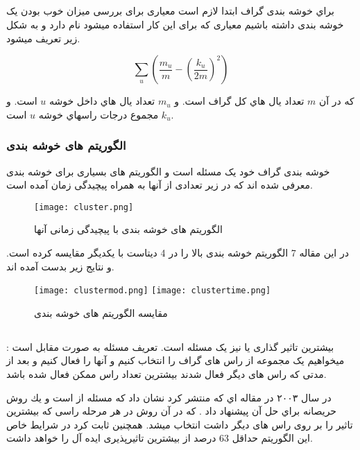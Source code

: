 \documentclass[12pt]{article}
\begin{document}
\subsection{}
\subsubsection{}
براي خوشه بندی گراف ابتدا لازم است معياری برای بررسی ميزان خوب بودن يک خوشه بندی داشته 
باشيم معياری که برای اين کار استفاده ميشود 
 نام دارد و به شكل زير تعريف ميشود.
 
\[
\sum_u \left(\frac{m_u}{m} - \left( \frac{k_u}{2m} \right) ^ 2 \right)
\]

كه در آن 
$m$
 تعداد يال هاي كل گراف است. و 
 $m_u$
  تعداد يال هاي داخل خوشه 
  $u$
   است. و 
   $k_u$
    مجموع 
درجات راسهاي خوشه 
$u$
 است.
 
\subsubsection{الگوریتم های خوشه بندی}
خوشه بندی گراف خود یک مسئله 
است و الگوریتم های بسیاری برای خوشه بندی معرفی شده اند که در زير تعدادی از آنها به همراه 
پيچيدگی زمان آمده است.

\begin{figure}[htbp]
\centering
\texttt{[image: cluster.png]}
\caption{الگوریتم های خوشه بندی با پیچیدگی زمانی آنها}
\end{figure}

\newpage

در این مقاله 7 الگوریتم خوشه بندی بالا را در 4 دیتاست با یکدیگر مقایسه کرده است.
\cite{lee}
و نتایج زیر بدست آمده اند.

\begin{figure}[htbp]
\texttt{[image: clustermod.png]}
\texttt{[image: clustertime.png]}
\caption{مقایسه الگوریتم های خوشه بندی}
\end{figure}


\subsection{}
بیشترین تاثیر گذاری یا 
نیز یک مسئله 
است.
تعریف مسئله به صورت مقابل است : میخواهیم یک مجموعه از راس های گراف را انتخاب کنیم و آنها را فعال کنیم و بعد از مدتی که راس های دیگر فعال شدند بیشترین تعداد راس ممکن فعال شده باشد.

در سال ۲۰۰۳ در مقاله اي كه 
 منتشر كرد
 نشان داد كه مسئله 
از
 است و يك روش حريصانه براي حل آن پيشنهاد داد . 
 که در آن روش در هر مرحله راسی 
که بيشترين تاثير را بر روی راس های ديگر داشت انتخاب ميشد. همچنين ثابت کرد در شرايط خاص اين
الگوريتم حداقل 63 درصد از بيشترين تاثيرپذيری ايده آل را خواهد داشت.
 \cite{greedy}
\end{document}
